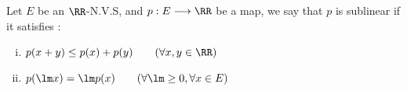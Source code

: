 
\begin{definition}[]
	Let $E $ be an $\RR$-N.V.S, and 
	$ p : E \longrightarrow \RR  $ be a map, 
	we say that $p $ is sublinear if it satisfies : 
	\begin{enumerate}[(i)]
	\item  
		$p(x+y)   \leq p(x) + p(y)  \quad  \quad 
		(\forall  x,y \in  \RR )$  
	\item  $p( \lm x) = \lm p(x) \quad \quad 
		(\forall  \lm \geq 0, \forall  x \in  E) $  
	\end{enumerate} 
\end{definition}
